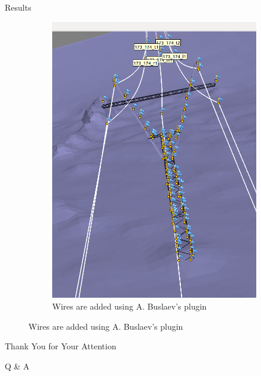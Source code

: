 \documentclass{beamer}
\begin{document}
\begin{frame}[t, fragile]{Results}
\begin{figure}
\begin{subfigure}{.5\textwidth}
\includegraphics[scale=0.15]{results_cool_wires}
\caption{Wires are added using A. Buslaev's plugin}
\end{subfigure}
\end{figure}
\end{frame}


\begin{frame}[fragile]{Thank You for Your Attention}

\begin{center}
\Huge Q \& A
\end{center}
\end{frame}
\end{document}
